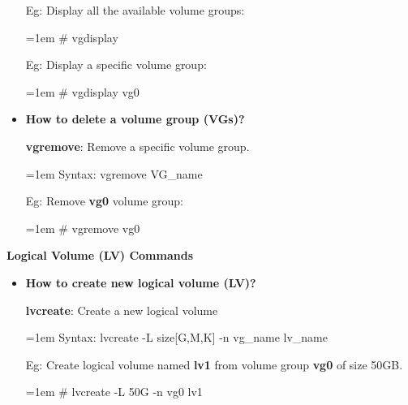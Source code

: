 \begin{flushleft}
\begin{itemize}
		Eg: Display all the available volume groups:
		\begin{tcolorbox}[breakable,notitle,boxrule=-0pt,colback=black,colframe=black]
			\color{green}
			\font=1em
			\# vgdisplay
			\font=4pt
		\end{tcolorbox}
		Eg: Display a specific volume group:
		\begin{tcolorbox}[breakable,notitle,boxrule=-0pt,colback=black,colframe=black]
			\color{green}
			\font=1em
			\# vgdisplay vg0
			\font=4pt
		\end{tcolorbox}
		
		\bigskip
		\bigskip
		\item  \textbf{How to delete a volume group (VGs)?}
		
		\textbf{vgremove}: Remove a specific volume group.
		\begin{tcolorbox}[breakable,notitle,boxrule=-0pt,colback=pink,colframe=pink]
			\color{black}
			\font=1em
			Syntax: vgremove VG\_name
			\font=4pt
		\end{tcolorbox}
		
		Eg: Remove \textbf{vg0} volume group:
		\begin{tcolorbox}[breakable,notitle,boxrule=-0pt,colback=black,colframe=black]
			\color{green}
			\font=1em
			\# vgremove vg0
			\font=4pt
		\end{tcolorbox}
		
	\end{itemize}
	
	\newpage
	
	\textbf{Logical Volume (LV) Commands}
	
	\begin{itemize}
		\item \textbf{How to create new logical volume (LV)?}
		
		\textbf{lvcreate}: Create a new logical volume
		\begin{tcolorbox}[breakable,notitle,boxrule=-0pt,colback=pink,colframe=pink]
			\color{black}
			\font=1em
			Syntax: lvcreate -L size[G,M,K] -n vg\_name  lv\_name
			\font=4pt
		\end{tcolorbox}
		
		
		
		\bigskip
		
		Eg: Create logical volume named \textbf{lv1} from volume group \textbf{vg0} of size 50GB.
		\bigskip
		\begin{tcolorbox}[breakable,notitle,boxrule=-0pt,colback=black,colframe=black]
			\color{green}
			\font=1em
			\# lvcreate -L 50G -n vg0 lv1
			\font=4pt
		\end{tcolorbox}
				

\end{itemize}
\end{flushleft}
